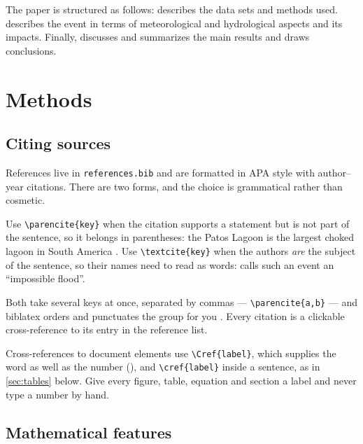 The paper is structured as follows:  describes
the data sets and methods used.  describes the
event in terms of meteorological and hydrological aspects and its
impacts. Finally,  discusses and summarizes
the main results and draws conclusions.

\section{Methods} \label{sec:methods}

\lipsum[4]

\subsection{Citing sources} \label{sec:citations}

References live in \texttt{references.bib} and are formatted in
APA style with author--year citations. There are two forms, and
the choice is grammatical rather than cosmetic.

Use \verb|\parencite{key}| when the citation supports a statement
but is not part of the sentence, so it belongs in parentheses:
the Patos Lagoon is the largest choked lagoon in South America
\parencite{chagas2022}. Use \verb|\textcite{key}| when the
authors \emph{are} the subject of the sentence, so their names
need to read as words: \textcite{montanari2024} calls such an
event an ``impossible flood''.

Both take several keys at once, separated by commas ---
\verb|\parencite{a,b}| --- and biblatex orders and punctuates the
group for you \parencite{marengo2023a,marengo2023b,marengo2024}.
Every citation is a clickable cross-reference to its entry in the
reference list.

Cross-references to document elements use \verb|\Cref{label}|,
which supplies the word as well as the number
(), and \verb|\cref{label}| inside a
sentence, as in \cref{sec:tables} below. Give every figure,
table, equation and section a label and never type a number by
hand.

\lipsum[5-8]

\subsection{Mathematical features} \label{sec:equations}

